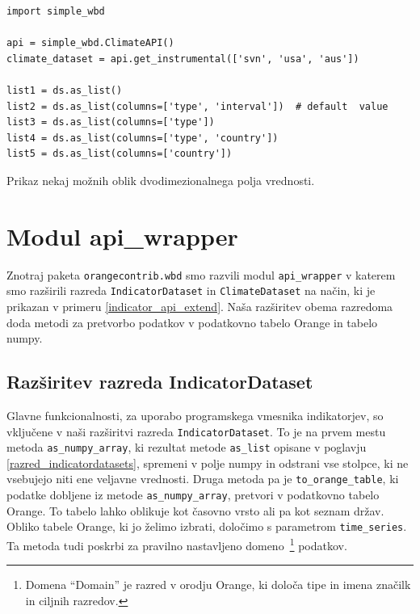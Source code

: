 \begin{snippet}
\begin{center}
\begin{lstlisting}
import simple_wbd

api = simple_wbd.ClimateAPI()                   
climate_dataset = api.get_instrumental(['svn', 'usa', 'aus'])

list1 = ds.as_list()
list2 = ds.as_list(columns=['type', 'interval'])  # default  value
list3 = ds.as_list(columns=['type'])
list4 = ds.as_list(columns=['type', 'country']) 
list5 = ds.as_list(columns=['country'])
\end{lstlisting}
\end{center}
\cprotect
\caption{Prikaz nekaj možnih oblik dvodimezionalnega polja vrednosti.} 
\label{list_configurations}
\end{snippet} 



\section{Modul api\_wrapper}


Znotraj paketa \verb|orangecontrib.wbd| smo razvili modul \verb|api_wrapper| v
katerem smo razširili razreda \verb|IndicatorDataset| in \verb|ClimateDataset|
na način, ki je prikazan v primeru \ref{indicator_api_extend}. Naša
razširitev obema razredoma doda metodi za pretvorbo podatkov v podatkovno 
tabelo Orange in tabelo numpy.

\subsection{Razširitev razreda IndicatorDataset}

Glavne funkcionalnosti, za uporabo programskega vmesnika indikatorjev, so
vključene v naši razširitvi razreda \verb|IndicatorDataset|. To je na prvem
mestu metoda \verb|as_numpy_array|, ki rezultat metode \verb|as_list|
opisane v poglavju \ref{razred_indicatordatasets}, spremeni v polje numpy in odstrani vse
stolpce, ki ne vsebujejo niti ene veljavne vrednosti. Druga metoda pa je
\verb|to_orange_table|, ki podatke dobljene iz metode \verb|as_numpy_array|,
pretvori v podatkovno tabelo Orange. To tabelo lahko oblikuje kot časovno
vrsto ali pa kot seznam držav. %
Obliko tabele Orange, ki jo želimo izbrati,
določimo s parametrom \verb|time_series|. %
Ta metoda tudi poskrbi za pravilno nastavljeno domeno~\footnote{Domena
``Domain'' je razred v orodju Orange, ki določa tipe in imena značilk in
ciljnih razredov.} podatkov.


